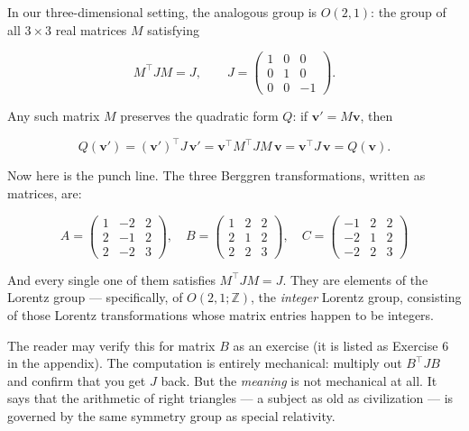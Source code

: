 \documentclass[11pt,openright,twoside]{book}
\theoremstyle{definition}
\begin{document}
In our three-dimensional setting, the analogous group is $O(2,1)$: the group of all $3 \times 3$ real matrices $M$ satisfying

\[M^\top J M = J, \qquad J = \begin{pmatrix} 1 & 0 & 0 \\ 0 & 1 & 0 \\ 0 & 0 & -1 \end{pmatrix}.\]

Any such matrix $M$ preserves the quadratic form $Q$: if $\mathbf{v}' = M\mathbf{v}$, then

\[Q(\mathbf{v}') = (\mathbf{v}')^\top J\, \mathbf{v}' = \mathbf{v}^\top M^\top J M\, \mathbf{v} = \mathbf{v}^\top J\, \mathbf{v} = Q(\mathbf{v}).\]

Now here is the punch line. The three Berggren transformations, written as matrices, are:

\[A = \begin{pmatrix} 1 & -2 & 2 \\ 2 & -1 & 2 \\ 2 & -2 & 3 \end{pmatrix}, \quad B = \begin{pmatrix} 1 & 2 & 2 \\ 2 & 1 & 2 \\ 2 & 2 & 3 \end{pmatrix}, \quad C = \begin{pmatrix} -1 & 2 & 2 \\ -2 & 1 & 2 \\ -2 & 2 & 3 \end{pmatrix}\]

And every single one of them satisfies $M^\top J M = J$. They are elements of the Lorentz group --- specifically, of $O(2,1; \mathbb{Z})$, the \textit{integer} Lorentz group, consisting of those Lorentz transformations whose matrix entries happen to be integers.

The reader may verify this for matrix $B$ as an exercise (it is listed as Exercise 6 in the appendix). The computation is entirely mechanical: multiply out $B^\top J B$ and confirm that you get $J$ back. But the \textit{meaning} is not mechanical at all. It says that the arithmetic of right triangles --- a subject as old as civilization --- is governed by the same symmetry group as special relativity.
\end{document}
